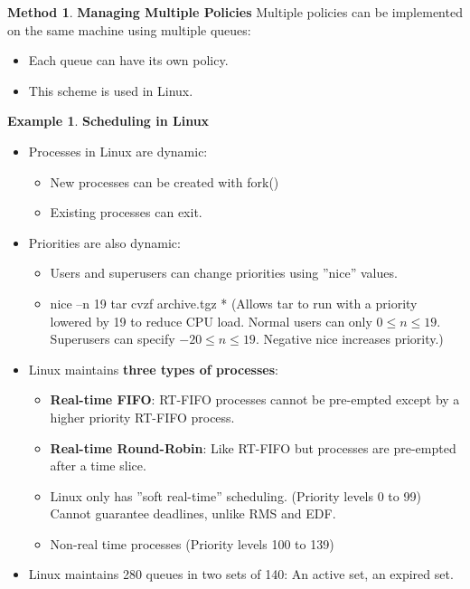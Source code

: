 \documentclass[12pt,a4paper]{article}
\theoremstyle{definition}
\newtheorem{example}{Example}[section]
\newtheorem{method}{Method}[section]
\newenvironment{myitemize}
{ \begin{itemize}
    \setlength{\itemsep}{5pt}
    \setlength{\parskip}{0pt}
    \setlength{\parsep}{0pt}     }
{ \end{itemize}                  }
\begin{document}
\begin{method}{\textbf{Managing Multiple Policies}}
	Multiple policies can be implemented on the same machine using multiple queues:
	\begin{myitemize}
		\item Each queue can have its own policy.
		\item This scheme is used in Linux.
	\end{myitemize}
\end{method}

\begin{example}{\textbf{Scheduling in Linux}}
	\begin{myitemize}
		\item Processes in Linux are dynamic:
		\begin{myitemize}
			\item New processes can be created with \textsf{fork()}
			\item Existing processes can exit.
		\end{myitemize}
		\item Priorities are also dynamic:
		\begin{myitemize}
			\item Users and superusers can change priorities using ''nice'' values.
			\item \textsf{nice –n 19 tar cvzf archive.tgz *} (Allows tar to run with a priority lowered by 19 to reduce CPU load. Normal users can only $0\leq n \leq 19$. Superusers can specify $-20\leq n \leq 19$. Negative nice increases priority.)
		\end{myitemize}
		\item Linux maintains \textbf{three types of processes}:
		\begin{myitemize}
			\item \textbf{Real-time FIFO}: \textsf{RT-FIFO} processes cannot be pre-empted except by a higher priority \textsf{RT-FIFO} process.
			\item \textbf{Real-time Round-Robin}: Like \textsf{RT-FIFO} but processes are pre-empted after a time slice.
			\item Linux only has ''soft real-time'' scheduling. (Priority levels 0 to 99) Cannot guarantee deadlines, unlike \textsf{RMS} and \textsf{EDF}. 
			\item Non-real time processes (Priority levels 100 to 139)
		\end{myitemize}
		\item Linux maintains 280 queues in two sets of 140: An active set, an expired set.

\end{myitemize}
\end{example}
\end{document}
